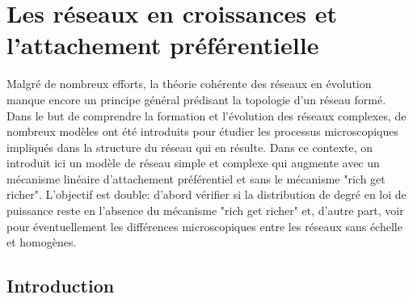 \newcommand{\kms}{\textless k_s(t) \textgreater}
\newcommand{\kmss}{\textless k_s^2(t) \textgreater}

\chapter{Les réseaux en croissances et l'attachement préférentielle}

Malgré de nombreux efforts, la théorie cohérente des réseaux en évolution manque encore un principe général prédisant la topologie d'un réseau formé. Dans le but de comprendre la formation et l'évolution des réseaux complexes, de nombreux modèles ont été introduits pour étudier les processus microscopiques impliqués dans la structure du réseau qui en résulte. Dans ce contexte, on introduit ici un modèle de réseau simple et complexe qui augmente avec un mécanisme linéaire d'attachement préférentiel et sans le mécanisme "rich get richer".
L'objectif est double: d'abord vérifier si la distribution de degré en loi de puissance reste en l'absence du mécanisme "rich get richer" et, d'autre part, voir pour éventuellement les différences microscopiques entre les réseaux sans échelle et homogènes. 

\section{Introduction}


